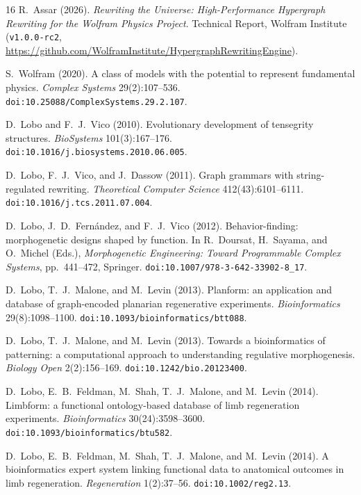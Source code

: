 \documentclass[11pt,a4paper]{article}
\theoremstyle{definition}
\theoremstyle{remark}
\begin{document}
\begin{thebibliography}{16}
R.~Assar (2026). \emph{Rewriting the Universe: High-Performance Hypergraph Rewriting for the Wolfram Physics Project}. Technical Report, Wolfram Institute (\texttt{v1.0.0-rc2}, \url{https://github.com/WolframInstitute/HypergraphRewritingEngine}).

S.~Wolfram (2020). A class of models with the potential to represent fundamental physics. \emph{Complex Systems} 29(2):107--536. \texttt{doi:10.25088/ComplexSystems.29.2.107}.

D.~Lobo and F.~J.~Vico (2010). Evolutionary development of tensegrity structures. \emph{BioSystems} 101(3):167--176. \texttt{doi:10.1016/j.biosystems.2010.06.005}.

D.~Lobo, F.~J.~Vico, and J.~Dassow (2011). Graph grammars with string-regulated rewriting. \emph{Theoretical Computer Science} 412(43):6101--6111. \texttt{doi:10.1016/j.tcs.2011.07.004}.

D.~Lobo, J.~D.~Fern\'andez, and F.~J.~Vico (2012). Behavior-finding: morphogenetic designs shaped by function. In R.~Doursat, H.~Sayama, and O.~Michel (Eds.), \emph{Morphogenetic Engineering: Toward Programmable Complex Systems}, pp.~441--472, Springer. \texttt{doi:10.1007/978-3-642-33902-8\_17}.

D.~Lobo, T.~J.~Malone, and M.~Levin (2013). Planform: an application and database of graph-encoded planarian regenerative experiments. \emph{Bioinformatics} 29(8):1098--1100. \texttt{doi:10.1093/bioinformatics/btt088}.

D.~Lobo, T.~J.~Malone, and M.~Levin (2013). Towards a bioinformatics of patterning: a computational approach to understanding regulative morphogenesis. \emph{Biology Open} 2(2):156--169. \texttt{doi:10.1242/bio.20123400}.

D.~Lobo, E.~B.~Feldman, M.~Shah, T.~J.~Malone, and M.~Levin (2014). Limbform: a functional ontology-based database of limb regeneration experiments. \emph{Bioinformatics} 30(24):3598--3600. \texttt{doi:10.1093/bioinformatics/btu582}.

D.~Lobo, E.~B.~Feldman, M.~Shah, T.~J.~Malone, and M.~Levin (2014). A bioinformatics expert system linking functional data to anatomical outcomes in limb regeneration. \emph{Regeneration} 1(2):37--56. \texttt{doi:10.1002/reg2.13}.


\end{thebibliography}
\end{document}

